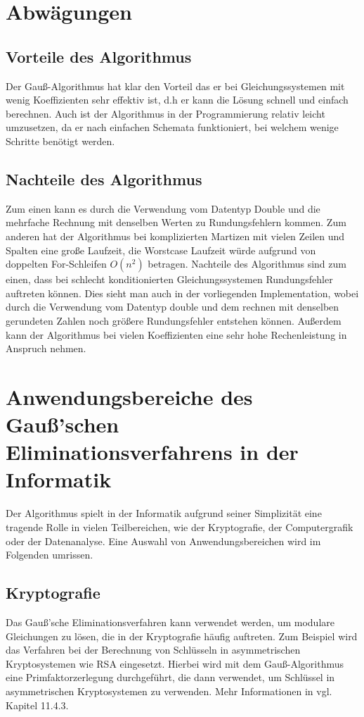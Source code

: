 \documentclass[a4paper, 12pt]{report}
\begin{document}
{\let\clearpage\relax \chapter{Abwägungen}}
\section{Vorteile des Algorithmus}
Der Gauß-Algorithmus hat klar den Vorteil das er bei Gleichungssystemen mit wenig Koeffizienten
sehr effektiv ist, d.h er kann die Lösung schnell und einfach berechnen.
Auch ist der Algorithmus in der Programmierung relativ leicht umzusetzen,
da er nach einfachen Schemata funktioniert, bei welchem wenige Schritte benötigt werden.
\section{Nachteile des Algorithmus}
Zum einen kann es durch die Verwendung vom Datentyp Double und die mehrfache Rechnung mit denselben Werten zu Rundungsfehlern kommen.
Zum anderen hat der Algorithmus bei komplizierten Martizen mit vielen Zeilen und Spalten eine große Laufzeit,
die Worstcase Laufzeit würde aufgrund von doppelten For-Schleifen $ O(n^2) $ betragen.
Nachteile des Algorithmus sind zum einen, dass bei schlecht konditionierten Gleichungssystemen Rundungsfehler auftreten können.
Dies sieht man auch in der vorliegenden Implementation, wobei durch die Verwendung vom Datentyp double
und dem rechnen mit denselben gerundeten Zahlen noch größere Rundungsfehler entstehen können.
Außerdem kann der Algorithmus bei vielen Koeffizienten eine
sehr hohe Rechenleistung in Anspruch nehmen.

{\let\clearpage\relax \chapter{Anwendungsbereiche des Gauß'schen \\ Eliminationsverfahrens in der Informatik}}
Der Algorithmus spielt in der Informatik aufgrund seiner Simplizität eine tragende Rolle in vielen Teilbereichen,
wie der Kryptografie, der Computergrafik oder der Datenanalyse.
Eine Auswahl von Anwendungsbereichen wird im Folgenden umrissen.
\section{Kryptografie}
Das Gauß'sche Eliminationsverfahren kann verwendet werden, um modulare Gleichungen zu lösen,
die in der Kryptografie häufig auftreten.
Zum Beispiel wird das Verfahren bei der Berechnung von Schlüsseln in asymmetrischen Kryptosystemen wie RSA eingesetzt.
Hierbei wird mit dem Gauß-Algorithmus eine Primfaktorzerlegung durchgeführt, die dann
verwendet, um Schlüssel in asymmetrischen Kryptosystemen zu verwenden. Mehr Informationen in \cite{3} vgl. Kapitel 11.4.3.
\end{document}
